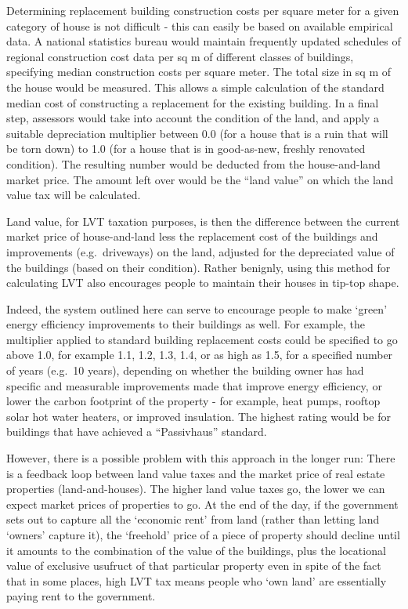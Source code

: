 \documentclass[]{tufte-handout}
\begin{document}
Determining replacement building construction costs per square meter for
a given category of house is not difficult - this can easily be based on
available empirical data. A national statistics bureau would maintain
frequently updated schedules of regional construction cost data per sq m
of different classes of buildings, specifying median construction costs
per square meter. The total size in sq m of the house would be measured.
This allows a simple calculation of the standard median cost of
constructing a replacement for the existing building. In a final step,
assessors would take into account the condition of the land, and apply a
suitable depreciation multiplier between 0.0 (for a house that is a ruin
that will be torn down) to 1.0 (for a house that is in good-as-new,
freshly renovated condition). The resulting number would be deducted
from the house-and-land market price. The amount left over would be the
``land value'' on which the land value tax will be calculated.

Land value, for LVT taxation purposes, is then the difference between
the current market price of house-and-land less the replacement cost of
the buildings and improvements (e.g.~driveways) on the land, adjusted
for the depreciated value of the buildings (based on their condition).
Rather benignly, using this method for calculating LVT also encourages
people to maintain their houses in tip-top shape.

Indeed, the system outlined here can serve to encourage people to make
`green' energy efficiency improvements to their buildings as well. For
example, the multiplier applied to standard building replacement costs
could be specified to go above 1.0, for example 1.1, 1.2, 1.3, 1.4, or
as high as 1.5, for a specified number of years (e.g.~10 years),
depending on whether the building owner has had specific and measurable
improvements made that improve energy efficiency, or lower the carbon
footprint of the property - for example, heat pumps, rooftop solar hot
water heaters, or improved insulation. The highest rating would be for
buildings that have achieved a ``Passivhaus'' standard.

However, there is a possible problem with this approach in the longer
run: There is a feedback loop between land value taxes and the market
price of real estate properties (land-and-houses). The higher land value
taxes go, the lower we can expect market prices of properties to go. At
the end of the day, if the government sets out to capture all the
`economic rent' from land (rather than letting land `owners' capture
it), the `freehold' price of a piece of property should decline until it
amounts to the combination of the value of the buildings, plus the
locational value of exclusive usufruct of that particular property even
in spite of the fact that in some places, high LVT tax means people who
`own land' are essentially paying rent to the government.
\end{document}
